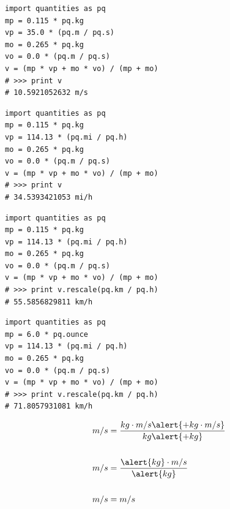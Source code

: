\documentclass[17pt]{beamer}
\begin{document}
\begin{frame}[fragile]
  \vspace{-22pt}
  \begin{verbatim}
import quantities as pq
mp = 0.115 * pq.kg
vp = 35.0 * (pq.m / pq.s)
mo = 0.265 * pq.kg
vo = 0.0 * (pq.m / pq.s)
v = (mp * vp + mo * vo) / (mp + mo)
# >>> print v
# 10.5921052632 m/s
  \end{verbatim}
\end{frame}

\begin{frame}[fragile]
  \vspace{-22pt}
  \begin{verbatim}
import quantities as pq
mp = 0.115 * pq.kg
vp = 114.13 * (pq.mi / pq.h)
mo = 0.265 * pq.kg
vo = 0.0 * (pq.m / pq.s)
v = (mp * vp + mo * vo) / (mp + mo)
# >>> print v
# 34.5393421053 mi/h
  \end{verbatim}
\end{frame}

\begin{frame}[fragile]
  \vspace{-22pt}
  \begin{verbatim}
import quantities as pq
mp = 0.115 * pq.kg
vp = 114.13 * (pq.mi / pq.h)
mo = 0.265 * pq.kg
vo = 0.0 * (pq.m / pq.s)
v = (mp * vp + mo * vo) / (mp + mo)
# >>> print v.rescale(pq.km / pq.h)
# 55.5856829811 km/h
  \end{verbatim}
\end{frame}

\begin{frame}[fragile]
  \vspace{-22pt}
  \begin{verbatim}
import quantities as pq
mp = 6.0 * pq.ounce
vp = 114.13 * (pq.mi / pq.h)
mo = 0.265 * pq.kg
vo = 0.0 * (pq.m / pq.s)
v = (mp * vp + mo * vo) / (mp + mo)
# >>> print v.rescale(pq.km / pq.h)
# 71.8057931081 km/h
  \end{verbatim}
\end{frame}

\begin{frame}
  \vspace{-20pt}
  \begin{align*}
    m/s &= \frac{kg \cdot m / s \alert{+ kg \cdot m / s}}{kg \alert{+ kg}} \\ & \\
    m/s &= \frac{\alert{kg} \cdot m / s}{\alert{kg}} \\ & \\
    m/s &= m/s
  \end{align*}
\end{frame}
\end{document}
